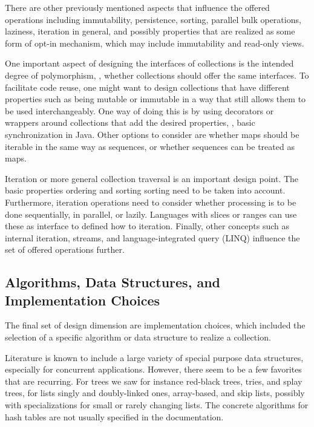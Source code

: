 \documentclass[sigconf, 10pt]{acmart}
\begin{document}
There are other previously mentioned aspects
that influence the offered operations including immutability, persistence,
sorting, parallel bulk operations, laziness, iteration in general,
and possibly properties that are realized as some form of opt-in mechanism,
which may include immutability and read-only views.


One important aspect of designing the interfaces of collections is the intended
degree of polymorphism,
\ie, whether collections should offer the same interfaces.
To facilitate code reuse, one might want to design collections
that have different properties such as being mutable or immutable
in a way that still allows them to be used interchangeably.
One way of doing this is by using decorators or wrappers around collections
that add the desired properties, \eg, basic synchronization in Java.
Other options to consider are whether maps should be iterable
in the same way as sequences, or whether sequences can be treated as maps.


Iteration or more general collection traversal is an important design point.
The basic properties ordering and sorting sorting need to be taken into account.
Furthermore, iteration operations need to consider whether processing is
to be done sequentially, in parallel, or lazily.
Languages with slices or ranges can use these as interface
to defined how to iteration.
Finally, other concepts such as internal iteration, streams,
and language-integrated query (LINQ)
influence the set of offered operations further.

\subsection{Algorithms, Data Structures, and Implementation Choices}
\label{sec:impl-choices}

The final set of design dimension are implementation choices,
which included the selection of a specific algorithm or data structure
to realize a collection.

Literature is known to include a large variety of special purpose
data structures, especially for concurrent applications.
However, there seem to be a few favorites that are recurring.
For
trees we saw for instance red-black trees, tries, and splay trees,
for lists singly and doubly-linked ones, array-based, and skip lists,
possibly with specializations for small or rarely changing lists.
%
The concrete algorithms for hash tables are not usually specified
in the documentation.
\end{document}
